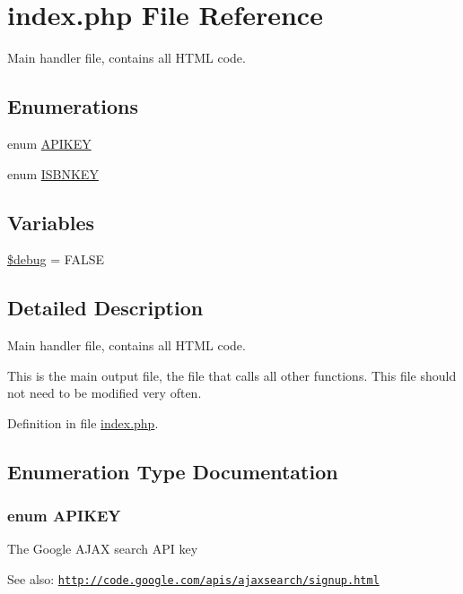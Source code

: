 \hypertarget{index_8php}{
\section{index.php File Reference}
\label{index_8php}
}
Main handler file, contains all HTML code. 

\subsection*{Enumerations}
\begin{CompactItemize}
\item 
enum \hyperlink{index_8php_cb68d0635f57ee9137fb7985a2357c5c}{APIKEY} 
\item 
enum \hyperlink{index_8php_93bb4a6cf53ca9db8d391bc20eee6442}{ISBNKEY} 
\end{CompactItemize}
\subsection*{Variables}
\begin{CompactItemize}
\item 
\hyperlink{index_8php_85ae3e64cd40e9564adceb010085e9dd}{\$debug} = FALSE
\end{CompactItemize}


\subsection{Detailed Description}
Main handler file, contains all HTML code. 

This is the main output file, the file that calls all other functions. This file should not need to be modified very often. 

Definition in file \hyperlink{index_8php-source}{index.php}.

\subsection{Enumeration Type Documentation}
\hypertarget{index_8php_cb68d0635f57ee9137fb7985a2357c5c}{
\subsubsection{\setlength{\rightskip}{0pt plus 5cm}enum {\bf APIKEY}}}
\label{index_8php_cb68d0635f57ee9137fb7985a2357c5c}


The Google AJAX search API key \begin{Desc}
\item[See also:]\href{http://code.google.com/apis/ajaxsearch/signup.html}{\tt http://code.google.com/apis/ajaxsearch/signup.html} \end{Desc}


